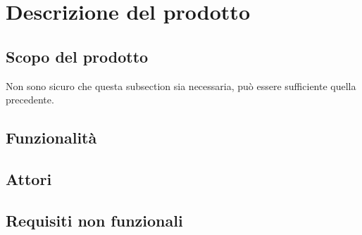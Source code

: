 \section{Descrizione del prodotto}

\subsection{Scopo del prodotto}
Non sono sicuro che questa subsection sia necessaria, può essere sufficiente
quella precedente.

\subsection{Funzionalità}

\subsection{Attori}

\subsection{Requisiti non funzionali}

